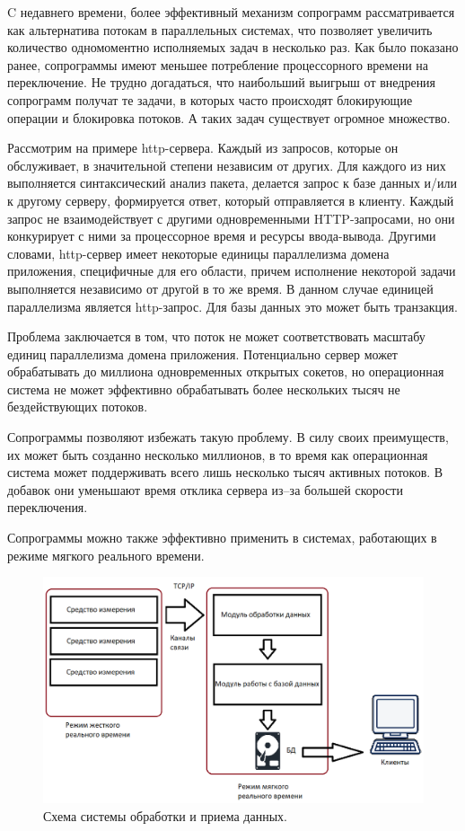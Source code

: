 	C недавнего времени, более эффективный механизм сопрограмм рассматривается
	как альтернатива потокам в параллельных системах, что позволяет увеличить количество одномоментно 
	исполняемых задач в несколько раз. Как было показано ранее, сопрограммы имеют меньшее
	потребление процессорного времени на переключение. Не трудно догадаться, что наибольший
	выигрыш от внедрения сопрограмм получат те задачи, в которых часто происходят блокирующие
	операции и блокировка потоков. А таких задач существует огромное множество.
	\par
	Рассмотрим на примере http-сервера. Каждый из запросов, которые он обслуживает, в значительной
	степени независим от других. Для каждого из них выполняется синтаксический анализ пакета, делается
	запрос к базе данных и/или к другому серверу, формируется ответ, который отправляется в клиенту. 
	Каждый запрос не взаимодействует с другими одновременными HTTP-запросами, но они конкурирует с ними за процессорное время и ресурсы ввода-вывода.
	Другими словами, http-сервер имеет некоторые единицы параллелизма домена приложения, 
	специфичные для его области, причем исполнение некоторой задачи выполняется независимо от другой в
	то же время. В данном случае единицей параллелизма является http-запрос. Для базы данных это может
	быть транзакция.
	\par
	Проблема заключается в том, что поток не может соответствовать масштабу единиц параллелизма домена приложения.
	Потенциально сервер может обрабатывать до миллиона
	одновременных открытых сокетов, но операционная система не может эффективно обрабатывать более нескольких
	тысяч не бездействующих потоков.
	\par
	Сопрограммы позволяют избежать такую проблему. В силу своих преимуществ, их может быть
	созданно несколько миллионов, в то время как операционная система может поддерживать всего 
	лишь несколько тысяч активных потоков. В добавок они уменьшают время отклика сервера из--за
	большей скорости переключения.
	\par
	Сопрограммы можно также эффективно применить в системах, работающих в режиме мягкого
	реального времени.
	\begin{figure}[h]
		\caption{Схема системы  обработки и приема данных.}\label{img-sys}
		\includegraphics[width=0.95\linewidth]{image/system.png}
	\end{figure}
